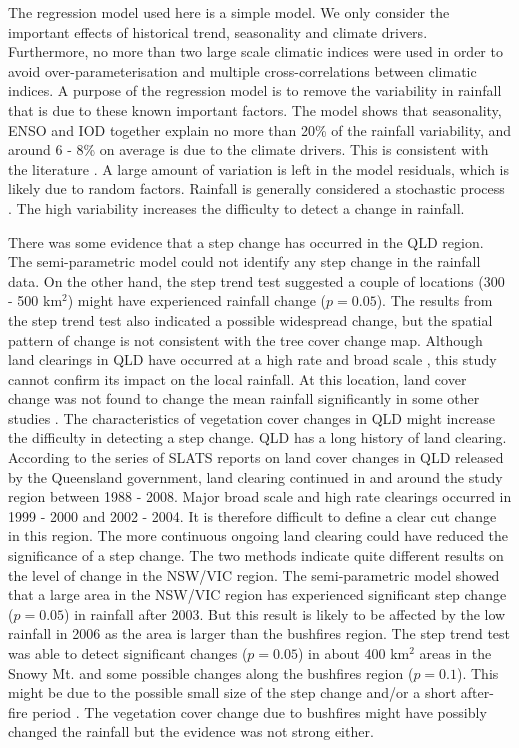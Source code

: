 \documentclass[authoryear,preprint,review,12pt]{elsarticle}
\begin{document}
The regression model used here is a simple model. We only consider the important effects of historical trend, seasonality and climate drivers. Furthermore, no more than two large scale climatic indices were used in order to avoid over-parameterisation and multiple cross-correlations between climatic indices. A purpose of the regression model is to remove the variability in rainfall that is due to these known important factors. The model shows that seasonality, ENSO and IOD together explain no more than 20\% of the rainfall variability, and around 6 - 8\% on average is due to the climate drivers. This is consistent with the literature \citep[e.g.][]{Westra2010}. A large amount of variation is left in the model residuals, which is likely due to random factors. Rainfall is generally considered a stochastic process \citep[e.g.][]{Fowler2005,Cowpertwait2009,Burton2010}. The high variability increases the difficulty to detect a change in rainfall. 

There was some evidence that a step change has occurred in the QLD region. The semi-parametric model could not identify any step change in the rainfall data. On the other hand, the step trend test suggested a couple of locations (300 - 500 km$^2$) might have experienced rainfall change ($p = 0.05$). The results from the step trend test also indicated a possible widespread change, but the spatial pattern of change is not consistent with the tree cover change map. Although land clearings in QLD have occurred at a high rate and broad scale \citep{SLATS2005}, this study cannot confirm its impact on the local rainfall. At this location, land cover change was not found to change the mean rainfall significantly in some other studies \citep[e.g.][]{Narisma2003,McAlpine2007}. The characteristics of vegetation cover changes in QLD might increase the difficulty in detecting a step change. QLD has a long history of land clearing. According to the series of SLATS reports on land cover changes in QLD released by the Queensland government, land clearing continued in and around the study region between 1988 - 2008. Major broad scale and high rate clearings occurred in 1999 - 2000 and 2002 - 2004. It is therefore difficult to define a clear cut change in this region. The more continuous ongoing land clearing could have reduced the significance of a step change. 
The two methods indicate quite different results on the level of change in the NSW/VIC region. The semi-parametric model showed that a large area in the NSW/VIC region has experienced significant step change ($p = 0.05$) in rainfall after 2003. But this result is likely to be affected by the low rainfall in 2006 as the area is larger than the bushfires region. The step trend test was able to detect significant changes ($p = 0.05$) in about 400 km$^2$ areas in the Snowy Mt. and some possible changes along the bushfires region ($p = 0.1$). This might be due to the possible small size of the step change and/or a short after-fire period \citep{Hirsch1985}. The vegetation cover change due to bushfires might have possibly changed the rainfall but the evidence was not strong either. 
\end{document}
